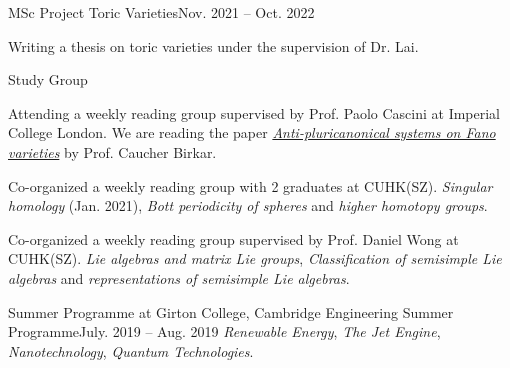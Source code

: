 \HeadingItemListStart
	\HeadingItem
		{MSc Project}{}
		{Toric Varieties}{Nov. 2021 -- Oct. 2022}
		\ItemListStart
			\item{Writing a thesis on toric varieties under the supervision of Dr. Lai.} %
		\ItemListEnd

	\HeadingItemPlain
		{Study Group}{}
		\ItemListStart
			\item Attending a weekly reading group supervised by Prof. Paolo Cascini at Imperial College London.
				We are reading the paper \href{https://arxiv.org/abs/1603.05765}{\textit{Anti-pluricanonical systems on Fano varieties}} by Prof. Caucher Birkar.
		\ItemListEnd
		\ItemListStart
			\item Co-organized a weekly reading group with 2 graduates at CUHK(SZ).
				{\textit{Singular homology} (Jan. 2021), \textit{Bott periodicity of spheres} and \textit{higher homotopy groups}.}
		\ItemListEnd
		\ItemListStart
			\item Co-organized a weekly reading group supervised by Prof. Daniel Wong at CUHK(SZ).
				{\textit{Lie algebras and matrix Lie groups},
				\textit{Classification of semisimple Lie algebras}
				and \textit{representations of semisimple Lie algebras}.}
		\ItemListEnd

	\HeadingItem
		{Summer Programme at Girton College, Cambridge}{}
		{Engineering Summer Programme}{July. 2019 -- Aug. 2019}
		\ItemListStart
				{\textit{Renewable Energy}, \textit{The Jet Engine}, \textit{Nanotechnology}, \textit{Quantum Technologies}.}
		\ItemListEnd
		
\HeadingItemListEnd

